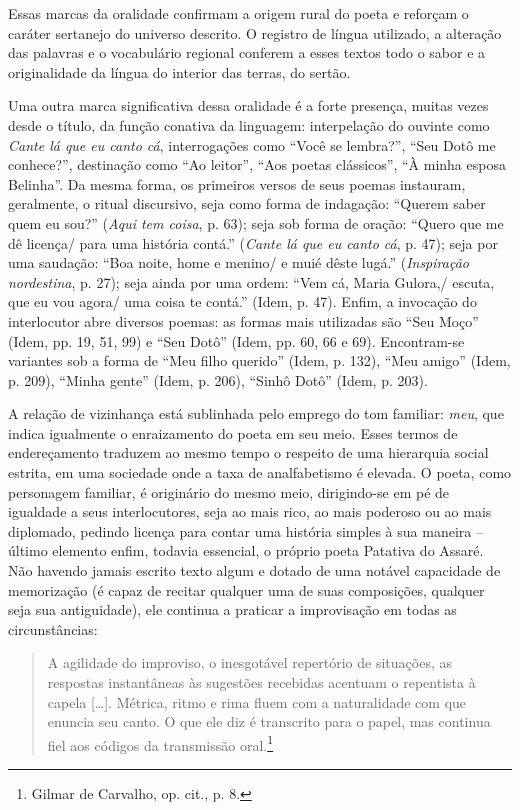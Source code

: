 \noindent Essas marcas da
oralidade confirmam a origem rural do poeta e reforçam o caráter sertanejo do
universo descrito. O registro de língua utilizado, a alteração das palavras e o
vocabulário regional conferem a esses textos todo o sabor e a originalidade da
língua do interior das terras, do sertão.

Uma outra marca significativa dessa oralidade é a forte presença, muitas vezes
desde o título, da função conativa da linguagem: interpelação do ouvinte como
\textit{Cante lá que eu canto cá}, interrogações como “Você se lembra?”, “Seu Dotô me
conhece?”, destinação como “Ao leitor”, “Aos poetas clássicos”, “À minha esposa
Belinha”. Da mesma forma, os primeiros versos de seus poemas instauram,
geralmente, o ritual discursivo, seja como forma de indagação: “Querem saber
quem eu sou?” (\textit{Aqui tem coisa}, p. 63); seja sob forma de oração: “Quero que me dê licença/
para uma história contá.” (\textit{Cante lá que eu canto cá}, p. 47); seja por uma saudação: “Boa noite, home e menino/ e muié dêste lugá.” (\textit{Inspiração nordestina}, p. 27); 
seja ainda por uma ordem: “Vem cá,
Maria Gulora,/ escuta, que eu vou agora/ uma coisa te contá.” (Idem, p. 47). Enfim,
a invocação do interlocutor abre diversos poemas: as formas mais utilizadas são
“Seu Moço” (Idem, pp. 19, 51, 99) e “Seu Dotô” (Idem, pp. 60, 66 e 69). Encontram-se
variantes sob a forma de “Meu filho querido” (Idem, p. 132), “Meu amigo” (Idem, p.
209), “Minha gente” (Idem, p. 206), “Sinhô Dotô”
(Idem, p. 203).

A relação de vizinhança está sublinhada pelo emprego do tom familiar: \textit{meu}, que
indica igualmente o enraizamento do poeta em seu meio. Esses termos de
endereçamento traduzem ao mesmo tempo o respeito de uma hierarquia social
estrita, em uma sociedade onde a taxa de analfabetismo é elevada. O poeta, como
personagem familiar, é originário do mesmo meio, dirigindo-se em pé de igualdade
a seus interlocutores, seja ao mais rico, ao mais poderoso ou ao mais diplomado,
pedindo licença para contar uma história simples à sua maneira -- último
elemento enfim, todavia essencial, o próprio poeta Patativa do Assaré. Não
havendo jamais escrito texto algum e dotado de uma notável capacidade de
memorização (é capaz de recitar qualquer uma de suas composições, qualquer seja
sua antiguidade), ele continua a praticar a improvisação em todas as
circunstâncias:

\begin{quote}
A agilidade do improviso, o inesgotável repertório de
situações, as respostas instantâneas às sugestões recebidas acentuam o
repentista à capela [\ldots{}]. Métrica, ritmo e rima fluem com a naturalidade
com que enuncia seu canto. O que ele diz é transcrito para o papel, mas continua
fiel aos códigos da transmissão oral.\footnote{ Gilmar de Carvalho, op.
cit., p. 8.}
\end{quote}

